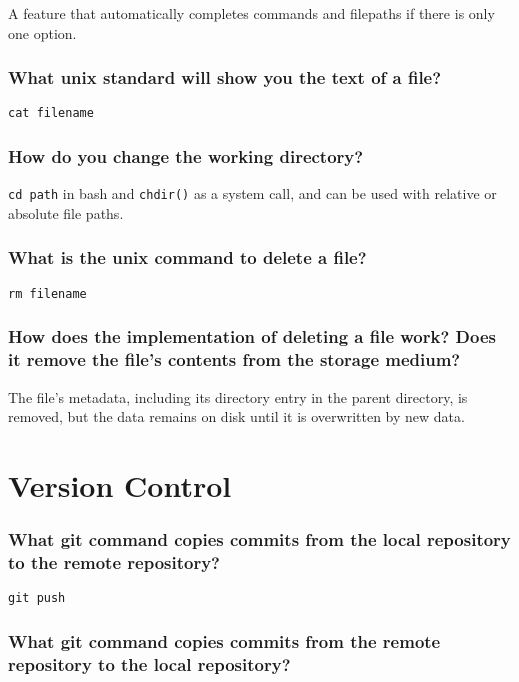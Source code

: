 \documentclass{article}
\newcommand{\inlinecode}[1]{\colorbox{gray!20}{\texttt{#1}}}
\begin{document}
A feature that automatically completes commands and filepaths if there is only one option.

\subsubsection*{What unix standard will show you the text of a file?}

\inlinecode{cat filename}

\subsubsection*{How do you change the working directory?}

\inlinecode{cd path} in bash and \inlinecode{chdir()} as a system call, and can be used with relative or absolute file paths.

\subsubsection*{What is the unix command to delete a file?}

\inlinecode{rm filename}

\subsubsection*{How does the implementation of deleting a file work? Does it remove the file's contents from the storage medium?}

The file's metadata, including its directory entry in the parent directory, is removed, but the data remains on disk until it is overwritten by new data.

\section*{Version Control}

\subsubsection*{What git command copies commits from the local repository to the remote repository?}

\inlinecode{git push}

\subsubsection*{What git command copies commits from the remote repository to the local repository?}
\end{document}
